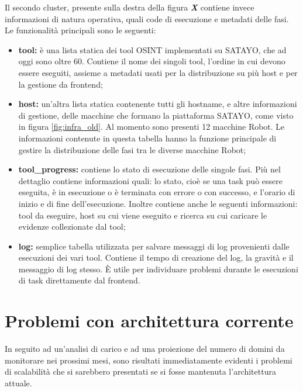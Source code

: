 Il secondo cluster, presente sulla destra della figura \textbf{\textit{X}}
contiene invece informazioni di natura operativa, quali code di esecuzione e metadati
delle fasi. Le funzionalità principali sono le seguenti:
\begin{itemize}
  \item \textbf{tool:} è una lista statica dei tool OSINT implementati su SATAYO,
    che ad oggi sono oltre 60. Contiene il nome dei singoli tool, l'ordine in
    cui devono essere eseguiti, assieme a metadati usati per la distribuzione su
    più host e per la gestione da frontend;

  \item \textbf{host:} un'altra lista statica contenente tutti gli hostname, e altre
    informazioni di gestione, delle macchine che formano la piattaforma SATAYO, come
    visto in figura \ref{fig:infra_old}. Al momento sono presenti 12 macchine
    Robot. Le informazioni contenute in questa tabella hanno la funzione principale
    di gestire la distribuzione delle fasi tra le diverse macchine Robot;

  \item \textbf{tool\_progress:} contiene lo stato di esecuzione delle singole
    fasi. Più nel dettaglio contiene informazioni quali: lo stato, cioè se una task
    può essere eseguita, è in esecuzione o è terminata con errore o con successo,
    e l'orario di inizio e di fine dell'esecuzione. Inoltre contiene anche le
    seguenti informazioni: tool da eseguire, host su cui viene eseguito e
    ricerca su cui caricare le evidenze collezionate dal tool;

  \item \textbf{log:} semplice tabella utilizzata per salvare messaggi di log
    provenienti dalle esecuzioni dei vari tool. Contiene il tempo di creazione del
    log, la gravità e il messaggio di log stesso. È utile per individuare problemi
    durante le esecuzioni di task direttamente dal frontend.
\end{itemize}

\pagebreak
\section{Problemi con architettura corrente}
\label{sec:problemi}

In seguito ad un'analisi di carico e ad una proiezione del numero di domini da monitorare
nei prossimi mesi, sono risultati immediatamente evidenti i problemi di
scalabilità che si sarebbero presentati se si fosse mantenuta l'architettura
attuale.

